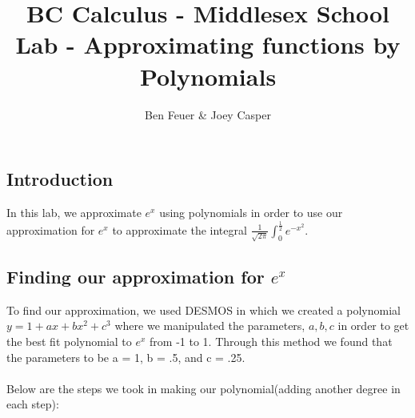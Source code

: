 \documentclass{report}
\title{\Huge{BC Calculus - Middlesex School}\\Lab - Approximating functions by Polynomials }
\author{\huge{Ben Feuer \& Joey Casper}}
\date{}
\begin{document}
\maketitle
\newpage%
\tableofcontents
\pagebreak

\chapter{}

\section{Introduction}
In this lab, we approximate $ e^x $ using polynomials in order to use our approximation for $ e^x $ to approximate the integral $ \frac{1}{\sqrt{2\pi } } \int _0 ^ \frac{1}{2} e^{-x^2} $.

\section{Finding our approximation for $e^x$}
To find our approximation, we used DESMOS in which we created a polynomial $ y = 1 + ax + bx^2 + c^3 $ where we manipulated the parameters, $ a, b, c $ in order to get the best fit polynomial to $ e^x $ from -1 to 1. Through this method we found that the parameters to be a = 1, b = .5, and c = .25. 
\\
\\
Below are the steps we took in making our polynomial(adding another degree in each step):


\end{document}

